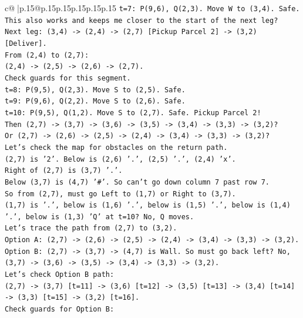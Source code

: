\documentclass{article}
\begin{document}
{\begin{supertabular}{c@{$\;$}|p{.15\linewidth}@{}p{.15\linewidth}p{.15\linewidth}p{.15\linewidth}p{.15\linewidth}p{.15\linewidth}}
{{{\texttt{t=7: P(9,6), Q(2,3). Move W to (3,4). Safe.} \\
\texttt{This also works and keeps me closer to the start of the next leg?} \\
\texttt{Next leg: (3,4) {-}> (2,4) {-}> (2,7) {[}Pickup Parcel 2{]} {-}> (3,2) {[}Deliver{]}.} \\
\texttt{From (2,4) to (2,7):} \\
\texttt{(2,4) {-}> (2,5) {-}> (2,6) {-}> (2,7).} \\
\texttt{Check guards for this segment.} \\
\texttt{t=8: P(9,5), Q(2,3). Move S to (2,5). Safe.} \\
\texttt{t=9: P(9,6), Q(2,2). Move S to (2,6). Safe.} \\
\texttt{t=10: P(9,5), Q(1,2). Move S to (2,7). Safe. Pickup Parcel 2!} \\
\texttt{Then (2,7) {-}> (3,7) {-}> (3,6) {-}> (3,5) {-}> (3,4) {-}> (3,3) {-}> (3,2)?} \\
\texttt{Or (2,7) {-}> (2,6) {-}> (2,5) {-}> (2,4) {-}> (3,4) {-}> (3,3) {-}> (3,2)?} \\
\texttt{Let's check the map for obstacles on the return path.} \\
\texttt{(2,7) is '2'. Below is (2,6) '.', (2,5) '.', (2,4) 'x'.} \\
\texttt{Right of (2,7) is (3,7) '.'.} \\
\texttt{Below (3,7) is (4,7) '\#'. So can't go down column 7 past row 7.} \\
\texttt{So from (2,7), must go Left to (1,7) or Right to (3,7).} \\
\texttt{(1,7) is '.', below is (1,6) '.', below is (1,5) '.', below is (1,4) '.', below is (1,3) 'Q' at t=10? No, Q moves.} \\
\texttt{Let's trace the path from (2,7) to (3,2).} \\
\texttt{Option A: (2,7) {-}> (2,6) {-}> (2,5) {-}> (2,4) {-}> (3,4) {-}> (3,3) {-}> (3,2).} \\
\texttt{Option B: (2,7) {-}> (3,7) {-}> (4,7) is Wall. So must go back left? No, (3,7) {-}> (3,6) {-}> (3,5) {-}> (3,4) {-}> (3,3) {-}> (3,2).} \\
\texttt{Let's check Option B path:} \\
\texttt{(2,7) {-}> (3,7) {[}t=11{]} {-}> (3,6) {[}t=12{]} {-}> (3,5) {[}t=13{]} {-}> (3,4) {[}t=14{]} {-}> (3,3) {[}t=15{]} {-}> (3,2) {[}t=16{]}.} \\
\texttt{Check guards for Option B:} \\
}}}
\end{supertabular}}
\end{document}
